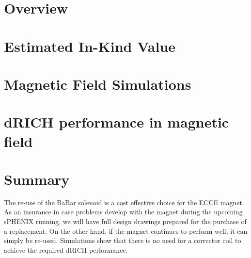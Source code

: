 \documentclass[12pt,twoside]{article}
\begin{document}
\linenumbers
\pagestyle{empty}



\pagestyle{plain}




\tableofcontents
\clearpage


\renewcommand{\thepage}{\arabic{page}}


\clearpage

\section {Overview}
\label{overview}
 

\section {Estimated In-Kind Value}
\label{costing}


\section {Magnetic Field Simulations}
\label{simulations}


\section {dRICH performance in magnetic field}
\label{dRICH}


\listoftodos[To Do]

\section{Summary}
\label{summary}
The re-use of the BaBar solenoid is a cost effective choice for the ECCE magnet.   As an insurance in case problems develop with the magnet during the upcoming sPHENIX running, we will have full design drawings prepared for the purchase of a replacement.   On the other hand, if the magnet continues to perform well, it can simply be re-used. Simulations show that there is no need for a corrector coil to achieve the required dRICH performance.  




\end{document}
